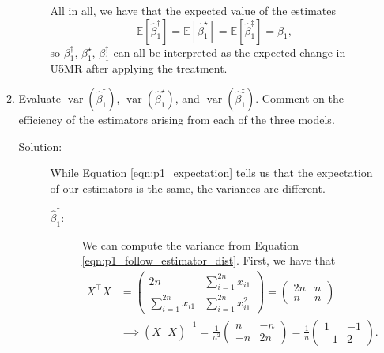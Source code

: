 \documentclass[letterpaper,11pt]{article}
\begin{document}
\begin{enumerate}
\begin{enumerate}
\begin{description}
      All in all, we have that the expected value of the estimates
      \begin{equation}
        \mathbb{E}\left[\hat{\beta}^\dagger_1\right] =
        \mathbb{E}\left[\hat{\beta}^\star_1\right] = 
        \mathbb{E}\left[\hat{\beta}_1^\ddagger\right] =
        \beta_1,
        \label{eqn:p1_expectation}
      \end{equation}
      so $\beta_1^\dagger$, $\beta_1^\star$, $\beta_1^\ddagger$ can all be
      interpreted as the expected change in U5MR after applying the treatment.
    \end{description}
  \item Evaluate $\operatorname{var}\left(\hat{\beta}_1^\dagger\right)$,
    $\operatorname{var}\left(\hat{\beta}_1^\star\right)$, and
    $\operatorname{var}\left(\hat{\beta}_1^\ddagger\right)$. Comment on the
    efficiency of the estimators arising from each of the three models.
    \begin{description}
    \item[Solution:] While Equation \ref{eqn:p1_expectation} tells us that the
      expectation of our estimators is the same, the variances are different.

      \begin{description}
      \item[$\hat{\beta}_1^\dagger$:] We can compute the variance from Equation
        \ref{eqn:p1_follow_estimator_dist}. First, we have that
        \begin{align}
          X^\intercal X
          &= \begin{pmatrix}
            2n & \sum_{i=1}^{2n} x_{i1}  \\
            \sum_{i=1}^{2n} x_{i1} & \sum_{i=1}^{2n} x_{i1}^2
          \end{pmatrix} = \begin{pmatrix}
            2n & n  \\
            n & n
          \end{pmatrix} \nonumber\\
          &\implies \left(X^\intercal X\right)^{-1}
            = \frac{1}{n^2}\begin{pmatrix}
              n & -n \\
              -n & 2n
            \end{pmatrix} = \frac{1}{n}\begin{pmatrix}
              1 & -1 \\
              -1 & 2
            \end{pmatrix}. \label{eqn:p1_inverse_gramian}
        \end{align}


\end{description}
\end{description}
\end{enumerate}
\end{enumerate}
\end{document}
